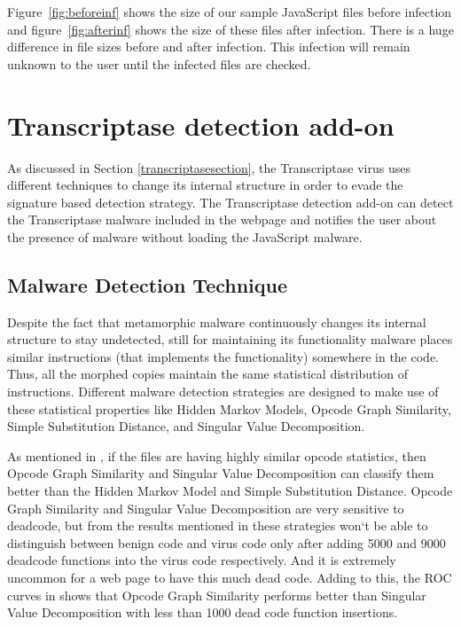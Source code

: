Figure~\ref{fig:beforeinf} shows the size of our sample JavaScript files before infection and figure~\ref{fig:afterinf} shows the size of these files after infection. There is a huge difference in file sizes before and after infection. This infection will remain unknown to the user until the infected files are checked.

\section{Transcriptase detection add-on} 

As discussed in Section \ref{transcriptasesection}, the Transcriptase virus uses different techniques to change its internal structure in order to evade the signature based detection strategy. The Transcriptase detection add-on can detect the Transcriptase malware included in the webpage and notifies the user about the presence of malware without loading the JavaScript malware.

\subsection{Malware Detection Technique} 
Despite the fact that metamorphic malware continuously changes its internal structure to stay undetected, still for maintaining its functionality malware places similar instructions (that implements the functionality) somewhere in the code. Thus, all the morphed copies maintain the same statistical distribution of instructions. Different malware detection strategies are designed to make use of these statistical properties like Hidden Markov Models, Opcode Graph Similarity, Simple Substitution Distance, and Singular Value Decomposition.

As mentioned in \cite{bib4}, if the files are having highly similar opcode statistics, then Opcode Graph Similarity and Singular Value Decomposition can classify them better than the Hidden Markov Model and Simple Substitution Distance. Opcode Graph Similarity and Singular Value Decomposition are very sensitive to deadcode, but from the results mentioned in \cite{bib4} these strategies won`t be able to distinguish between benign code and virus code only after adding 5000 and 9000 deadcode functions into the virus code respectively. And it is extremely uncommon for a web page to have this much dead code. Adding to this, the ROC curves in \cite{bib4} shows that Opcode Graph Similarity performs better than Singular Value Decomposition with less than 1000 dead code function insertions.

